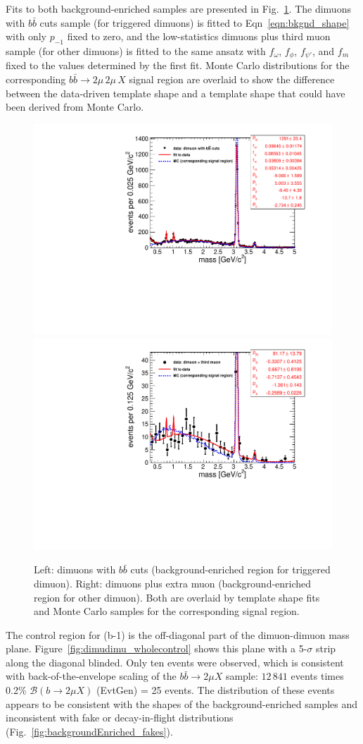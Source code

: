 \documentclass[12pt]{cms-tdr}
\begin{document}
Fits to both background-enriched samples are presented in
Fig.~\ref{fig:backgroundEnriched_massCF}.  The dimuons with $b\bar{b}$
cuts sample (for triggered dimuons) is fitted to
Eqn~\ref{eqn:bkgnd_shape} with only $p_{-1}$ fixed to zero, and the
low-statistics dimuons plus third muon sample (for other dimuons) is
fitted to the same ansatz with $f_\omega$, $f_\phi$, $f_{\psi'}$, and
$f_m$ fixed to the values determined by the first fit.  Monte Carlo
distributions for the corresponding $b\bar{b} \to 2\mu \, 2\mu \, X$ signal
region are overlaid to show the difference between the data-driven
template shape and a template shape that could have been derived from
Monte Carlo.

\begin{figure}
\includegraphics[width=0.5\linewidth]{PLOTS/fullscale-backgroundEnriched_massC.pdf}
\includegraphics[width=0.5\linewidth]{PLOTS/fullscale-backgroundEnriched_massF.pdf}

\caption{Left: dimuons with $b\bar{b}$ cuts (background-enriched
  region for triggered dimuon).  Right: dimuons plus extra muon
  (background-enriched region for other dimuon).  Both are overlaid
  by template shape fits and Monte Carlo samples for the
  corresponding signal region. \label{fig:backgroundEnriched_massCF}}
\end{figure}

The control region for (b-1) is the off-diagonal part of the
dimuon-dimuon mass plane.  Figure~\ref{fig:dimudimu_wholecontrol}
shows this plane with a 5-$\sigma$ strip along the diagonal blinded.
Only ten events were observed, which is consistent with
back-of-the-envelope scaling of the $b\bar{b} \to 2\mu X$ sample:
$12\,841$ events times 0.2\% $\mathcal{B}(b \to 2\mu X)$ (EvtGen) = 25
events.  The distribution of these events appears to be consistent
with the shapes of the background-enriched samples and inconsistent
with fake or decay-in-flight distributions
(Fig.~\ref{fig:backgroundEnriched_fakes}).
\end{document}
